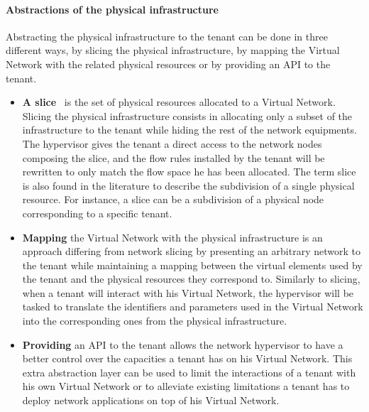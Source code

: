 \paragraph{Abstractions of the physical infrastructure}
Abstracting the physical infrastructure to the tenant can be done in three different ways, by slicing the physical infrastructure, by mapping the Virtual Network with the related physical resources or by providing an API to the tenant.
\begin{itemize}
    \item \textbf{A slice}~\cite{FlowVisor-Sherwood2009} is the set of physical resources allocated to a Virtual Network.
Slicing the physical infrastructure consists in allocating only a subset of the infrastructure to the tenant while hiding the rest of the network equipments.
The hypervisor gives the tenant a direct access to the network nodes composing the slice, and the flow rules installed by the tenant will be rewritten to only match the flow space he has been allocated.
The term slice is also found in the literature to describe the subdivision of a single physical resource. For instance, a slice can be a subdivision of a physical node corresponding to a specific tenant.

\item \textbf{Mapping} the Virtual Network with the physical infrastructure is an approach differing from network slicing by presenting an arbitrary network to the tenant while maintaining a mapping between the virtual elements used by the tenant and the physical resources they correspond to.
Similarly to slicing, when a tenant will interact with his Virtual Network, the hypervisor will be tasked to translate the identifiers and parameters used in the Virtual Network into the corresponding ones from the physical infrastructure.

\item \textbf{Providing} an API to the tenant allows the network hypervisor to have a better control over the capacities a tenant has on his Virtual Network. This extra abstraction layer can be used to limit the interactions of a tenant with his own Virtual Network or to alleviate existing limitations a tenant has to deploy network applications on top of his Virtual Network. 

\end{itemize}



